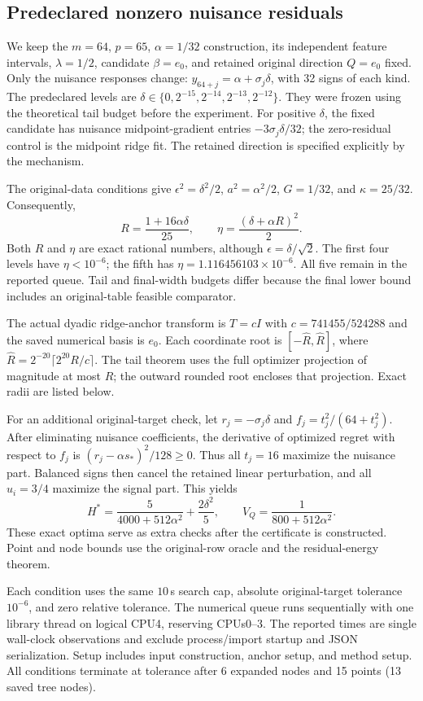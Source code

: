 \subsection{Predeclared nonzero nuisance residuals}
\label{app:epsilon}
We keep the $m=64$, $p=65$, $\alpha=1/32$ construction, its independent feature intervals, $\lambda=1/2$, candidate $\beta=e_0$, and retained original direction $Q=e_0$ fixed. Only the nuisance responses change: $y_{64+j}=\alpha+\sigma_j\delta$, with 32 signs of each kind. The predeclared levels are $\delta\in\{0,2^{-15},2^{-14},2^{-13},2^{-12}\}$. They were frozen using the theoretical tail budget before the experiment. For positive $\delta$, the fixed candidate has nuisance midpoint-gradient entries $-3\sigma_j\delta/32$; the zero-residual control is the midpoint ridge fit. The retained direction is specified explicitly by the mechanism.

The original-data conditions give $\epsilon^2=\delta^2/2$, $a^2=\alpha^2/2$, $G=1/32$, and $\kappa=25/32$. Consequently,
\[
R=\frac{1+16\alpha\delta}{25},\qquad
\eta=\frac{(\delta+\alpha R)^2}{2}.
\]
Both $R$ and $\eta$ are exact rational numbers, although $\epsilon=\delta/\sqrt{2}$. The first four levels have $\eta<10^{-6}$; the fifth has $\eta=1.116456103\times10^{-6}$. All five remain in the reported queue. Tail and final-width budgets differ because the final lower bound includes an original-table feasible comparator.

The actual dyadic ridge-anchor transform is $T=cI$ with $c=741455/524288$ and the saved numerical basis is $e_0$. Each coordinate root is $[-\widehat R,\widehat R]$, where $\widehat R=2^{-20}\lceil2^{20}R/c\rceil$. The tail theorem uses the full optimizer projection of magnitude at most $R$; the outward rounded root encloses that projection. Exact radii are listed below.

For an additional original-target check, let $r_j=-\sigma_j\delta$ and $f_j=t_j^2/(64+t_j^2)$. After eliminating nuisance coefficients, the derivative of optimized regret with respect to $f_j$ is $(r_j-\alpha s_*)^2/128\ge0$. Thus all $t_j=16$ maximize the nuisance part. Balanced signs then cancel the retained linear perturbation, and all $u_i=3/4$ maximize the signal part. This yields
\[
H^*=\frac5{4000+512\alpha^2}+\frac{2\delta^2}{5},\qquad
V_Q=\frac1{800+512\alpha^2}.
\]
These exact optima serve as extra checks after the certificate is constructed. Point and node bounds use the original-row oracle and the residual-energy theorem.

Each condition uses the same $10$\,s search cap, absolute original-target tolerance $10^{-6}$, and zero relative tolerance. The numerical queue runs sequentially with one library thread on logical CPU4, reserving CPUs0--3. The reported times are single wall-clock observations and exclude process/import startup and JSON serialization. Setup includes input construction, anchor setup, and method setup. All conditions terminate at tolerance after 6 expanded nodes and 15 points (13 saved tree nodes).

